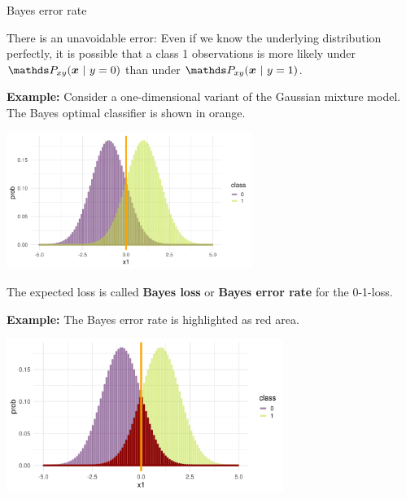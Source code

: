 \begin{vbframe}{Bayes error rate}

There is an unavoidable error: Even if we know the underlying distribution perfectly, it is possible that a class 1 observations is more likely under $\Pxy(\xv ~|~y = 0)$ than under $\Pxy(\xv ~|~y = 1)$. 

\lz 

\textbf{Example: } Consider a one-dimensional variant of the Gaussian mixture model. The Bayes optimal classifier is shown in orange. 

\begin{center}
\includegraphics[width = 8cm ]{figure_man/bayes_error_4.png} \\
\end{center}


\framebreak 

The expected loss is called \textbf{Bayes loss} or \textbf{Bayes error rate} for the 0-1-loss. 

\lz 

\textbf{Example: } The Bayes error rate is highlighted as red area. 

\begin{center}
\includegraphics[width = 9cm ]{figure_man/bayes_error_5.png} \\
\end{center}

\end{vbframe}

